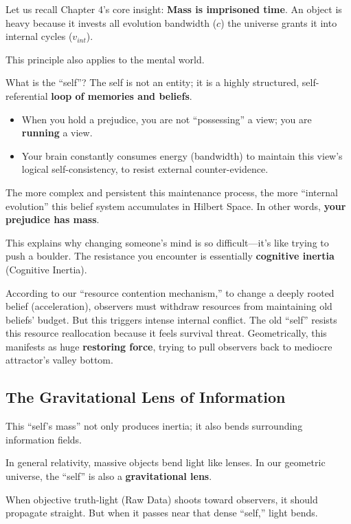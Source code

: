 \documentclass[11pt,a4paper,twoside]{book}
\begin{document}
Let us recall Chapter 4's core insight: \textbf{Mass is imprisoned time}. An object is heavy because it invests all evolution bandwidth ($c$) the universe grants it into internal cycles ($v_{int}$).

This principle also applies to the mental world.

What is the ``self''? The self is not an entity; it is a highly structured, self-referential \textbf{loop of memories and beliefs}.

\begin{itemize}
\item When you hold a prejudice, you are not ``possessing'' a view; you are \textbf{running} a view.

\item Your brain constantly consumes energy (bandwidth) to maintain this view's logical self-consistency, to resist external counter-evidence.
\end{itemize}

The more complex and persistent this maintenance process, the more ``internal evolution'' this belief system accumulates in Hilbert Space. In other words, \textbf{your prejudice has mass}.

This explains why changing someone's mind is so difficult---it's like trying to push a boulder. The resistance you encounter is essentially \textbf{cognitive inertia} (Cognitive Inertia).

According to our ``resource contention mechanism,'' to change a deeply rooted belief (acceleration), observers must withdraw resources from maintaining old beliefs' budget. But this triggers intense internal conflict. The old ``self'' resists this resource reallocation because it feels survival threat. Geometrically, this manifests as huge \textbf{restoring force}, trying to pull observers back to mediocre attractor's valley bottom.

\subsection{The Gravitational Lens of Information}

This ``self's mass'' not only produces inertia; it also bends surrounding information fields.

In general relativity, massive objects bend light like lenses. In our geometric universe, the ``self'' is also a \textbf{gravitational lens}.

When objective truth-light (Raw Data) shoots toward observers, it should propagate straight. But when it passes near that dense ``self,'' light bends.
\end{document}
